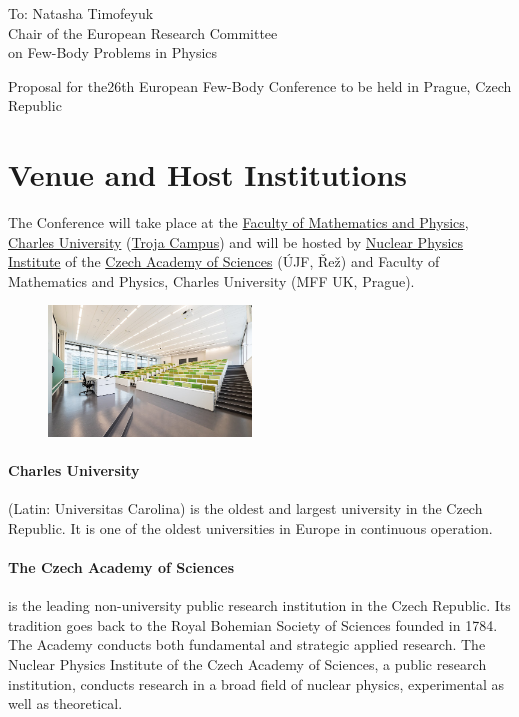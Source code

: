 \documentclass[12pt]{extarticle}
\begin{document}
\color{C0}

\noindent
To: Natasha Timofeyuk \\
Chair of the European Research Committee \\
on Few-Body Problems in Physics

\bigskip\bigskip

\noindent
\doublespacing
{\color{C4}\selectfont%
  \LARGE Proposal for the\newline 26th
  European Few-Body Conference\newline
  to be held in Prague, Czech Republic%
}

\bigskip

\onehalfspacing
\section*{Venue and Host Institutions}
\noindent
The Conference will take place at the
\href{https://www.mff.cuni.cz/en}{Faculty of Mathematics and Physics},
\href{https://cuni.cz/UKEN-1.html}{Charles University}
(\href{https://maps.app.goo.gl/YLm43Nb5XHHziMX16}{Troja Campus})
and will be hosted by
\href{http://www.ujf.cas.cz/en/}{Nuclear Physics Institute} of the
\href{https://www.avcr.cz/en/}{Czech Academy of Sciences} (ÚJF, Řež)
and Faculty of Mathematics and Physics, Charles University (MFF UK,
Prague).
\begin{figure}
  \centering
  \includegraphics[width=0.48\textwidth]{Impakt-troja_1}
\end{figure}

\paragraph{Charles University} (Latin: Universitas Carolina) is the oldest and
largest university in the Czech Republic. It is one of the oldest
universities in Europe in continuous operation.
% 

\paragraph{The Czech Academy of Sciences} is the leading non-university public
research institution in the Czech Republic. Its tradition goes back to
the Royal Bohemian Society of Sciences founded in 1784. The Academy
conducts both fundamental and strategic applied research. The
  Nuclear Physics Institute of the Czech Academy of Sciences, a
public research institution, conducts research in a broad field of
nuclear physics, experimental as well as theoretical.
%
\end{document}
